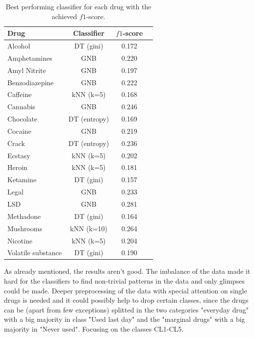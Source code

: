 \documentclass{article}
\begin{document}
\begin{table}[H]
		\centering
    \begin{tabular}{ l c c c }
        \toprule
        \textbf{Drug} & \textbf{Classifier} & \textbf{$f1$-score} \\
        \toprule
        Alcohol & DT (gini) & 0.172 \\
				Amphetamines & GNB & 0.220 \\
        Amyl Nitrite & GNB & 0.197 \\
				Benzodiazepine & GNB & 0.222 \\
				Caffeine & kNN (k=5) & 0.168 \\
				Cannabis & GNB & 0.246 \\
				Chocolate & DT (entropy) & 0.169 \\
        Cocaine & GNB & 0.219 \\
				Crack & DT (entropy) & 0.236 \\
				Ecstasy & kNN (k=5) & 0.202 \\
				Heroin & kNN (k=5) & 0.181 \\
				Ketamine & DT (gini) & 0.157 \\
				Legal & GNB & 0.233 \\
				LSD & GNB & 0.281 \\
        Methadone & DT (gini) & 0.164 \\
				Mushrooms & kNN (k=10) & 0.264 \\
				Nicotine & kNN (k=5) & 0.204 \\
				Volatile substance & DT (gini) & 0.190 \\
        \bottomrule
    \end{tabular}
		\caption{Best performing classifier for each drug with the achieved $f1$-score.}
		\label{tab:drugs_performance_overview}
\end{table}

As already mentioned, the results aren't good. The imbalance of the data made it hard for the classifiers to find non-trivial patterns in the data and only glimpses could be made. Deeper preprocessing of the data with special attention on single drugs is needed and it could possibly help to drop certain classes, since the drugs can be (apart from few exceptions) splitted in the two categories "everyday drug" with a big majority in class "Used last day" and the "marginal drugs" with a big majority in "Never used". Focusing on the classes CL1-CL5.
\end{document}
